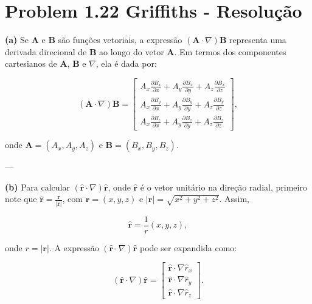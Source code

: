 \documentclass[a4paper,12pt]{article}
\begin{document}
\section*{Problem 1.22 Griffiths - Resolu\c{c}\~ao}

\textbf{(a)} Se $\mathbf{A}$ e $\mathbf{B}$ são funções vetoriais, a expressão $(\mathbf{A} \cdot \nabla)\mathbf{B}$ representa uma 
derivada direcional de $\mathbf{B}$ ao longo do vetor $\mathbf{A}$. Em termos dos componentes cartesianos de $\mathbf{A}$, $\mathbf{B}$ e 
$\nabla$, ela é dada por:

\begin{equation}
(\mathbf{A} \cdot \nabla)\mathbf{B} =
\begin{bmatrix}
A_x \frac{\partial B_x}{\partial x} + A_y \frac{\partial B_x}{\partial y} + A_z \frac{\partial B_x}{\partial z} \\
A_x \frac{\partial B_y}{\partial x} + A_y \frac{\partial B_y}{\partial y} + A_z \frac{\partial B_y}{\partial z} \\
A_x \frac{\partial B_z}{\partial x} + A_y \frac{\partial B_z}{\partial y} + A_z \frac{\partial B_z}{\partial z}
\end{bmatrix},
\end{equation}

onde $\mathbf{A} = (A_x, A_y, A_z)$ e $\mathbf{B} = (B_x, B_y, B_z)$.

---

\textbf{(b)} Para calcular $(\hat{\mathbf{r}} \cdot \nabla)\hat{\mathbf{r}}$, onde $\hat{\mathbf{r}}$ é o vetor unitário na direção 
radial, primeiro note que $\hat{\mathbf{r}} = \frac{\mathbf{r}}{|\mathbf{r}|}$, com $\mathbf{r} = (x, y, z)$ e $|\mathbf{r}| = \sqrt{x^2 + y^2 + z^2}$. 
Assim,

\begin{equation}
\hat{\mathbf{r}} = \frac{1}{r}(x, y, z),
\end{equation}

onde $r = |\mathbf{r}|$. A expressão $(\hat{\mathbf{r}} \cdot \nabla)\hat{\mathbf{r}}$ pode ser expandida como:

\begin{equation}
(\hat{\mathbf{r}} \cdot \nabla)\hat{\mathbf{r}} =
\begin{bmatrix}
\hat{\mathbf{r}} \cdot \nabla \hat{r}_x \\
\hat{\mathbf{r}} \cdot \nabla \hat{r}_y \\
\hat{\mathbf{r}} \cdot \nabla \hat{r}_z
\end{bmatrix}.
\end{equation}
\end{document}
